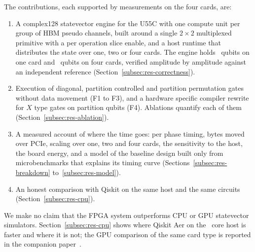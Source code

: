 The contributions, each supported by measurements on the four cards, are:
\begin{enumerate}
\item A complex128 statevector engine for the U55C with one compute unit per group of HBM pseudo channels, built
around a single $2\times2$ multiplexed primitive with a per operation slice enable, and a host runtime that distributes
the state over one, two or four cards. The engine holds \NumMaxWidthOneCard~qubits on one card and
\NumMaxWidthFourCards~qubits on four cards, verified amplitude by amplitude against an independent reference
(Section~\ref{subsec:res-correctness}).
\item Execution of diagonal, partition controlled and partition permutation gates without data movement (F1 to F3),
and a hardware specific compiler rewrite for $X$ type gates on partition qubits (F4). Ablations quantify each of
them (Section~\ref{subsec:res-ablation}).
\item A measured account of where the time goes: per phase timing, bytes moved over PCIe, scaling over one, two and
four cards, the sensitivity to the host, the board energy, and a model of the baseline design built only from
microbenchmarks that explains its timing curve (Sections~\ref{subsec:res-breakdown} to~\ref{subsec:res-model}).
\item An honest comparison with Qiskit on the same host and the same circuits (Section~\ref{subsec:res-cpu}).
\end{enumerate}
We make no claim that the FPGA system outperforms CPU or GPU statevector simulators. Section~\ref{subsec:res-cpu} shows
where Qiskit Aer on the \NumHostCores~core host is faster and where it is not; the GPU comparison of the same card type is
reported in the companion paper~\cite{tiwari2026fpga30}.
